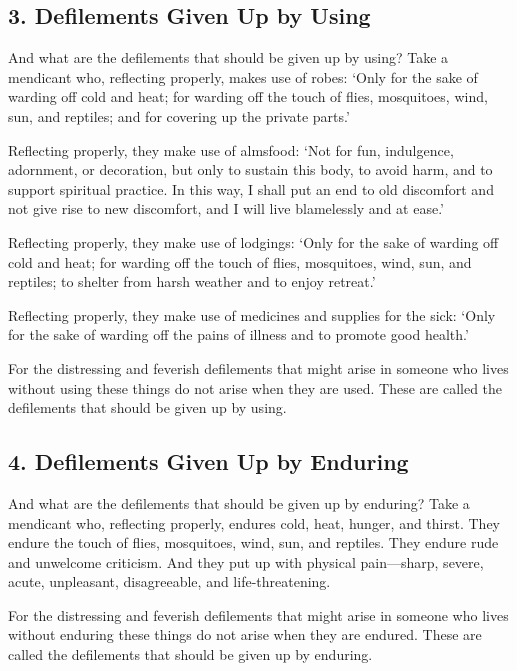 \documentclass[12pt,openany]{book}%
\begin{document}
\subsection*{3. Defilements Given Up by Using }

And what are the defilements that should be given up by using? Take a mendicant who, reflecting properly, makes use of robes: ‘Only for the sake of warding off cold and heat; for warding off the touch of flies, mosquitoes, wind, sun, and reptiles; and for covering up the private parts.’ 

Reflecting properly, they make use of almsfood: ‘Not for fun, indulgence, adornment, or decoration, but only to sustain this body, to avoid harm, and to support spiritual practice. In this way, I shall put an end to old discomfort and not give rise to new discomfort, and I will live blamelessly and at ease.’ 

Reflecting properly, they make use of lodgings: ‘Only for the sake of warding off cold and heat; for warding off the touch of flies, mosquitoes, wind, sun, and reptiles; to shelter from harsh weather and to enjoy retreat.’ 

Reflecting properly, they make use of medicines and supplies for the sick: ‘Only for the sake of warding off the pains of illness and to promote good health.’ 

For the distressing and feverish defilements that might arise in someone who lives without using these things do not arise when they are used. These are called the defilements that should be given up by using. 

\subsection*{4. Defilements Given Up by Enduring }

And what are the defilements that should be given up by enduring? Take a mendicant who, reflecting properly, endures cold, heat, hunger, and thirst. They endure the touch of flies, mosquitoes, wind, sun, and reptiles. They endure rude and unwelcome criticism. And they put up with physical pain—sharp, severe, acute, unpleasant, disagreeable, and life-threatening. 

For the distressing and feverish defilements that might arise in someone who lives without enduring these things do not arise when they are endured. These are called the defilements that should be given up by enduring. 
\end{document}
